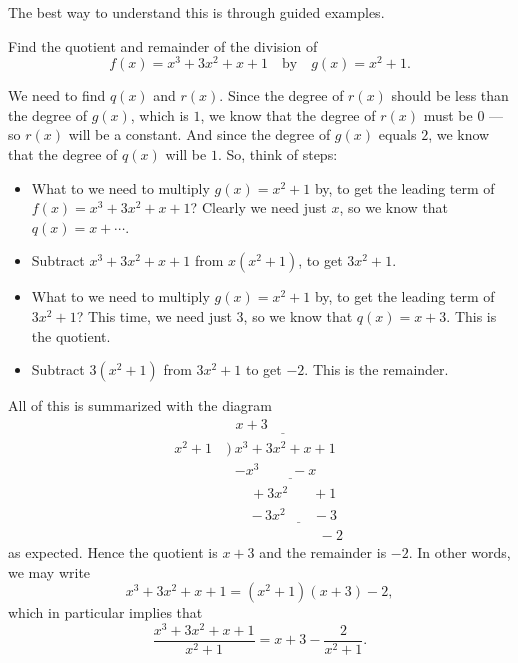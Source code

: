 \documentclass{ximera}
\begin{document}
The best way to understand this is through guided examples.

\begin{example}
  Find the quotient and remainder of the division of $$f(x) = x^3+3x^2+x+1\quad\mbox{by}\quad g(x) = x^2+1.$$
  
  \begin{explanation}
    We need to find $q(x)$ and $r(x)$. Since the degree of $r(x)$ should be less than the degree of $g(x)$, which is $1$, we know that the degree of $r(x)$ must be $0$ --- so $r(x)$ will be a constant. And since the degree of $g(x)$ equals $2$, we know that the degree of $q(x)$ will be $1$. So, think of steps:
    \begin{itemize}
    \item What to we need to multiply $g(x) = x^2+1$ by, to get the leading term of $f(x) = x^3+3x^2+x+1$? Clearly we need just $x$, so we know that $q(x) = x + \cdots$.
    \item Subtract $x^3+3x^2+x+1$ from $x(x^2+1)$, to get $3x^2+1$.
    \item What to we need to multiply $g(x) = x^2+1$ by, to get the leading term of $3x^2+1$? This time, we need just $3$, so we know that $q(x) = x + 3$. This is the quotient.
    \item Subtract $3(x^2+1)$ from $3x^2+1$ to get $-2$. This is the remainder. 
    \end{itemize}
All of this is summarized with the diagram \begin{align*}
   & \underline{~~~x+3\phantom{somethings}} \\[-4pt]  x^2+1~&\Big)~ x^3+3x^2+x+1 \\[-4pt] &\phantom{\big)~} \underline{-x^3\phantom{+3x^2}\!-x\phantom{+1...}} \\[-4pt] &\phantom{\Big)~}\phantom{0n\!}+3x^2\phantom{+0~}~+1 \\[-4pt] &\phantom{\big)~} \phantom{nn}\underline{-\,3x^2\phantom{+xn}-3\phantom{n}} \\ &\phantom{nnnnnnnnnnn}-2
\end{align*}
as expected. Hence the quotient is $x+3$ and the remainder is $-2$. In other words, we may write $$   x^3+3x^2+x+1 =(x^2+1)(x+3) - 2, $$which in particular implies that $$  \frac{x^3+3x^2+x+1}{x^2+1} = x+3 - \frac{2}{x^2+1}.  $$
  \end{explanation}
\end{example}
\end{document}

